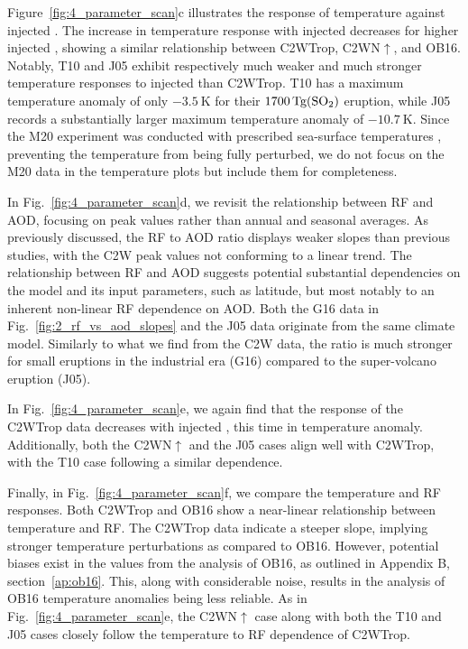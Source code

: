 \documentclass[draft]{agujournal2019}
\begin{document}
Figure~\ref{fig:4_parameter_scan}c illustrates the response of temperature against
injected . The increase in temperature response with injected  decreases
for higher injected , showing a similar relationship between C2WTrop,
C2WN\(\uparrow\), and OB16. Notably, T10 and J05 exhibit respectively much weaker and
much stronger temperature responses to injected  than C2WTrop. T10 has a maximum
temperature anomaly of only \(\SI{-3.5}{\kelvin}\) for their
\(\SI{1700}{\tera\gram(\ce{SO2})}\) eruption, while J05 records a substantially larger
maximum temperature anomaly of \(\SI{-10.7}{\kelvin}\). Since the M20 experiment was
conducted with prescribed sea-surface temperatures \cite{marshall2020}, preventing the
temperature from being fully perturbed, we do not focus on the M20 data in the
temperature plots but include them for completeness.

In Fig.~\ref{fig:4_parameter_scan}d, we revisit the relationship between RF and AOD,
focusing on peak values rather than annual and seasonal averages. As previously
discussed, the RF to AOD ratio displays weaker slopes than previous studies, with the
C2W peak values not conforming to a linear trend. The relationship between RF and AOD
suggests potential substantial dependencies on the model and its input parameters, such
as latitude, but most notably to an inherent non-linear RF dependence on AOD. Both the
G16 data in Fig.~\ref{fig:2_rf_vs_aod_slopes} and the J05 data originate from the same
climate model. Similarly to what we find from the C2W data, the ratio is much stronger
for small eruptions in the industrial era (G16) compared to the super-volcano eruption
(J05).

In Fig.~\ref{fig:4_parameter_scan}e, we again find that the response of the C2WTrop data
decreases with injected , this time in temperature anomaly. Additionally, both
the C2WN\(\uparrow\) and the J05 cases align well with C2WTrop, with the T10 case
following a similar dependence.

Finally, in Fig.~\ref{fig:4_parameter_scan}f, we compare the temperature and RF
responses. Both C2WTrop and OB16 show a near-linear relationship between temperature and
RF. The C2WTrop data indicate a steeper slope, implying stronger temperature
perturbations as compared to OB16. However, potential biases exist in the values from
the analysis of OB16, as outlined in Appendix B, section~\ref{ap:ob16}. This, along with
considerable noise, results in the analysis of OB16 temperature anomalies being less
reliable. As in Fig.~\ref{fig:4_parameter_scan}e, the C2WN\(\uparrow\) case along with
both the T10 and J05 cases closely follow the temperature to RF dependence of C2WTrop.
\end{document}
